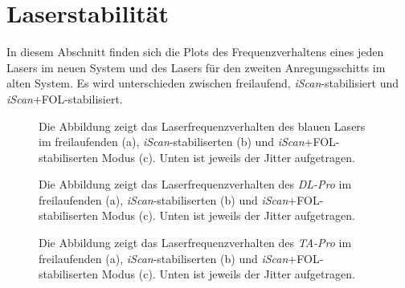 \section{Laserstabilität}\label{anh:sec:laserstabilitaet}
In diesem Abschnitt finden sich die Plots des Frequenzverhaltens eines jeden
Lasers im neuen System und des Lasers für den zweiten Anregungsschitts im alten
System. Es wird unterschieden zwischen freilaufend, \textit{iScan}-stabilisiert
und \textit{iScan}+FOL-stabilisiert.
\begin{figure}[hp]
 	\centering
 	\footnotesize
 	\fbox{\parbox{\dimexpr \linewidth - 2\fboxrule - 2\fboxsep}{
 	\subfloat[]{
		\label{subfig:laserstabilitaet_a_freilaufend}
		
		}\\
 	\subfloat[]{
		\label{subfig:laserstabilitaet_a_iScan}
		
		}\\
	 \subfloat[]{
		\label{subfig:laserstabilitaet_a_iScan+FOL}
		
		}
	}}
	\caption[Laserfrequenzverhalten blauer Laser]{Die Abbildung zeigt das
	Laserfrequenzverhalten des blauen Lasers im freilaufenden (a),
	\textit{iScan}-stabiliserten (b) und \textit{iScan}+FOL-stabiliserten Modus
	(c). Unten ist jeweils der Jitter aufgetragen.}
	\label{fig:laserstabilitaet_a}
\end{figure}
\begin{figure}[hp]
 	\centering
 	\footnotesize
 	\fbox{\parbox{\dimexpr \linewidth - 2\fboxrule - 2\fboxsep}{
 	\subfloat[]{
		\label{subfig:laserstabilitaet_b_freilaufend}
		
		}\\
 	\subfloat[]{
		\label{subfig:laserstabilitaet_b_iScan}
		
		}\\
	 \subfloat[]{
		\label{subfig:laserstabilitaet_b_iScan+FOL}
		
		}
	}}
	\caption[Laserfrequenzverhalten \textit{DL-Pro}]{Die Abbildung zeigt das
	Laserfrequenzverhalten des \textit{DL-Pro} im freilaufenden (a),
	\textit{iScan}-stabiliserten (b) und \textit{iScan}+FOL-stabiliserten Modus
	(c). Unten ist jeweils der Jitter aufgetragen.}
	\label{fig:laserstabilitaet_b}
\end{figure}
\begin{figure}[hp]
 	\centering
 	\footnotesize
 	\fbox{\parbox{\dimexpr \linewidth - 2\fboxrule - 2\fboxsep}{
 	\subfloat[]{
		\label{subfig:laserstabilitaet_c_freilaufend}
		
		}\\
 	\subfloat[]{
		\label{subfig:laserstabilitaet_c_iScan}
		
		}\\
	 \subfloat[]{
		\label{subfig:laserstabilitaet_c_iScan+FOL}
		
		}
	}}
	\caption[Laserfrequenzverhalten \textit{TA-Pro}]{Die Abbildung zeigt das
	Laserfrequenzverhalten des \textit{TA-Pro} im freilaufenden (a),
	\textit{iScan}-stabiliserten (b) und \textit{iScan}+FOL-stabiliserten Modus
	(c). Unten ist jeweils der Jitter aufgetragen.}
	\label{fig:laserstabilitaet_c}
\end{figure}

